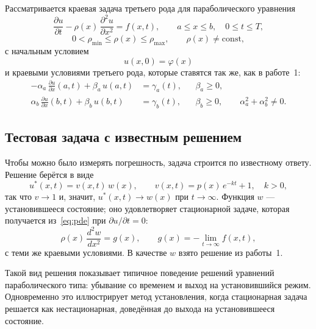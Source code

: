 \documentclass[12pt,a4paper]{article}
\begin{document}
Рассматривается краевая задача третьего рода для параболического
уравнения
\begin{equation}\label{eq:pde}
\frac{\partial u}{\partial t}-\rho(x)\,\frac{\partial^2u}{\partial x^2}
   = f(x,t),\qquad a\le x\le b,\quad 0\le t\le T,
\end{equation}
\begin{equation}\label{eq:rhocond}
0<\rho_{\min}\le\rho(x)\le\rho_{\max},\qquad \rho(x)\neq\mathrm{const},
\end{equation}
с начальным условием
\begin{equation}\label{eq:init}
u(x,0)=\varphi(x)
\end{equation}
и краевыми условиями третьего рода, которые ставятся так же, как в
работе~1:
\begin{equation}\label{eq:bc}
\begin{aligned}
-\alpha_a\,\frac{\partial u}{\partial x}(a,t)+\beta_a\,u(a,t)
  &=\gamma_a(t), && \beta_a\ge0,\\
 \alpha_b\,\frac{\partial u}{\partial x}(b,t)+\beta_b\,u(b,t)
  &=\gamma_b(t), && \beta_b\ge0,\qquad \alpha_a^2+\alpha_b^2\neq0 .
\end{aligned}
\end{equation}

\subsection{Тестовая задача с известным решением}

Чтобы можно было измерять погрешность, задача строится по известному
ответу. Решение берётся в виде
\begin{equation}\label{eq:ustar}
u^*(x,t)=v(x,t)\,w(x),\qquad
v(x,t)=p(x)\,e^{-kt}+1,\quad k>0,
\end{equation}
так что $v\to1$ и, значит, $u^*(x,t)\to w(x)$ при $t\to\infty$. Функция
$w$ --- установившееся состояние; оно удовлетворяет стационарной задаче,
которая получается из~\eqref{eq:pde} при $\partial u/\partial t=0$:
\begin{equation}\label{eq:stat}
\rho(x)\,\frac{d^2w}{dx^2}=g(x),\qquad g(x)=-\lim_{t\to\infty}f(x,t),
\end{equation}
с теми же краевыми условиями. В качестве $w$ взято решение из работы~1.

Такой вид решения показывает типичное поведение решений уравнений
параболического типа: убывание со временем и выход на установившийся
режим. Одновременно это иллюстрирует метод установления, когда
стационарная задача решается как нестационарная, доведённая до выхода на
установившееся состояние.
\end{document}
